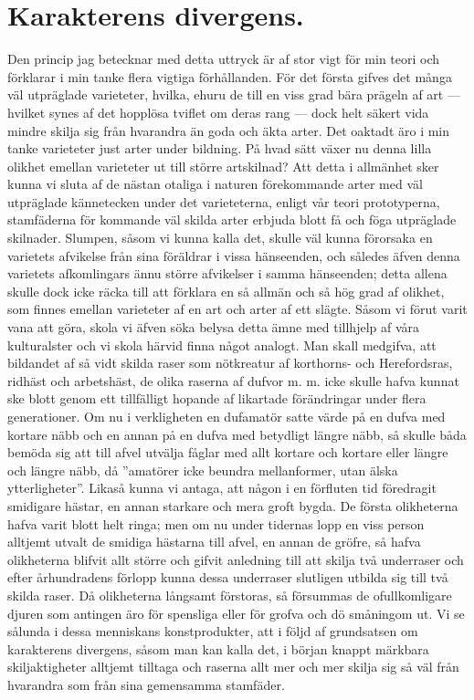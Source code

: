 \section{Karakterens divergens.}

Den princip jag betecknar med detta uttryck är af stor vigt för min teori och förklarar i min tanke flera vigtiga förhållanden. För det första gifves det många väl utpräglade varieteter, hvilka, ehuru de till en viss grad bära prägeln af art — hvilket synes af det hopplösa tviflet om deras rang — dock helt säkert vida mindre skilja sig från hvarandra än goda och äkta arter. Det oaktadt äro i min tanke varieteter just arter under bildning. På hvad sätt växer nu denna lilla olikhet emellan varieteter ut till större artskilnad? Att detta i allmänhet sker kunna vi sluta af de nästan otaliga i naturen förekommande arter med väl utpräglade kännetecken under det varieteterna, enligt vår teori prototyperna, stamfäderna för kommande väl skilda arter erbjuda blott få och föga utpräglade skilnader. Slumpen, såsom vi kunna kalla det, skulle väl kunna förorsaka en varietets afvikelse från sina föräldrar i vissa hänseenden, och således äfven denna varietets afkomlingars ännu större afvikelser i samma hänseenden; detta allena skulle dock icke räcka till att förklara en så allmän och så hög grad af olikhet, som finnes emellan varieteter af en art och arter af ett slägte.
Såsom vi förut varit vana att göra, skola vi äfven söka belysa detta ämne med tillhjelp af våra kulturalster och vi skola härvid finna något analogt. Man skall medgifva, att bildandet af så vidt skilda raser som nötkreatur af korthorns- och Herefordsras, ridhäst och arbetshäst, de olika raserna af dufvor m. m. icke skulle hafva kunnat ske blott genom ett tillfälligt hopande af likartade förändringar under flera generationer. Om nu i verkligheten en dufamatör satte värde på en dufva med kortare näbb och en annan på en dufva med betydligt längre näbb, så skulle båda bemöda sig att till afvel utvälja fåglar med allt kortare och kortare eller längre och längre näbb, då ”amatörer icke beundra mellanformer, utan älska ytterligheter”. Likaså kunna vi antaga, att någon i en förfluten tid föredragit smidigare hästar, en annan starkare och mera groft bygda. De första olikheterna hafva varit blott helt ringa; men om nu under tidernas lopp en viss person alltjemt utvalt de smidiga hästarna till afvel, en annan de gröfre, så hafva olikheterna blifvit allt större och gifvit anledning till att skilja två underraser och efter århundradens förlopp kunna dessa underraser slutligen utbilda sig till två skilda raser. Då olikheterna långsamt förstoras, så försummas de ofullkomligare djuren som antingen äro för spensliga eller för grofva och dö småningom ut. Vi se sålunda i dessa menniskans konstprodukter, att i följd af grundsatsen om karakterens divergens, såsom man kan kalla det, i början knappt märkbara skiljaktigheter alltjemt tilltaga och raserna allt mer och mer skilja sig så väl från hvarandra som från sina gemensamma stamfäder.

